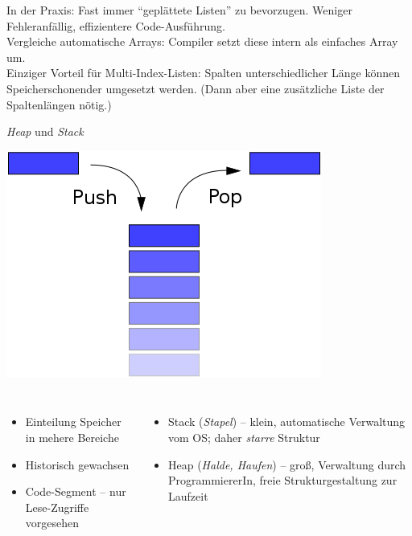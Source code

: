 
\begin{frame}
%
\begin{hintbox}
In der Praxis: Fast immer \enquote{geplättete Listen} zu bevorzugen. Weniger Fehleranfällig, effizientere Code-Ausführung.\\
Vergleiche automatische Arrays: Compiler setzt diese intern als einfaches Array um.\\
Einziger Vorteil für Multi-Index-Listen: Spalten unterschiedlicher Länge können Speicherschonender umgesetzt werden. (Dann aber eine zusätzliche Liste der Spaltenlängen nötig.)
\end{hintbox}
%
\end{frame}


\begin{frame}{\emph{Heap} und \emph{Stack}}
%
%
\hspace{10pt}
\includegraphics[width=.2\linewidth]{./gfx/Stack}
%
\begin{columns}[T]
\begin{itemize}
\item Einteilung Speicher in mehere Bereiche
\item Historisch gewachsen
\item Code-Segment -- nur Lese-Zugriffe vorgesehen
\end{itemize}
%
\begin{itemize}
\item Stack (\emph{Stapel}) -- klein, automatische Verwaltung vom OS; daher \emph{starre} Struktur
\item Heap (\emph{Halde, Haufen}) -- groß, Verwaltung durch ProgrammiererIn, freie Strukturgestaltung zur Laufzeit
\end{itemize}
\end{columns}
%
\end{frame}

